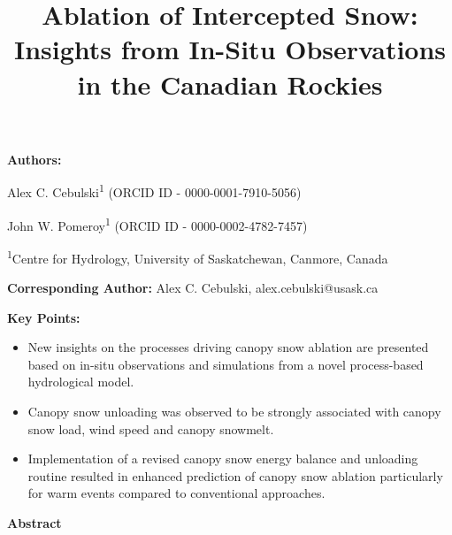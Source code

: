 \documentclass[
  letterpaper,
  DIV=11,
  numbers=noendperiod]{scrartcl}
\title{Ablation of Intercepted Snow: Insights from In-Situ Observations
in the Canadian Rockies}
\author{}
\date{}
\providecommand{\tightlist}{%
  \setlength{\itemsep}{0pt}\setlength{\parskip}{0pt}}\usepackage{longtable,booktabs,array}
\begin{document}
\maketitle



\textbf{Authors:}

Alex C. Cebulski\textsuperscript{1} (ORCID ID - 0000-0001-7910-5056)

John W. Pomeroy\textsuperscript{1} (ORCID ID - 0000-0002-4782-7457)

\textsuperscript{1}Centre for Hydrology, University of Saskatchewan,
Canmore, Canada

\textbf{Corresponding Author:} Alex C. Cebulski, alex.cebulski@usask.ca

\textbf{Key Points:}

\begin{itemize}
\tightlist
\item
  New insights on the processes driving canopy snow ablation are
  presented based on in-situ observations and simulations from a novel
  process-based hydrological model.
\item
  Canopy snow unloading was observed to be strongly associated with
  canopy snow load, wind speed and canopy snowmelt.
\item
  Implementation of a revised canopy snow energy balance and unloading
  routine resulted in enhanced prediction of canopy snow ablation
  particularly for warm events compared to conventional approaches.
\end{itemize}

\textbf{Abstract}
\end{document}
